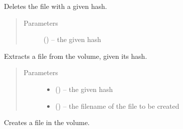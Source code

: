 \documentclass[letterpaper,10pt,english]{sphinxmanual}
\begin{document}
\begin{fulllineitems}

\begin{fulllineitems}
\label{\detokenize{index:fsbackup.hashVolume.HashVolume.remove}}
Deletes the file with a given hash.
\begin{quote}\begin{description}
\item[{Parameters}] \leavevmode
{} () -- the given hash

\end{description}\end{quote}

\end{fulllineitems}


\begin{fulllineitems}
\label{\detokenize{index:fsbackup.hashVolume.HashVolume.retrieveFilename}}
Extracts a file from the volume, given its hash.
\begin{quote}\begin{description}
\item[{Parameters}] \leavevmode\begin{itemize}
\item {} 
 () -- the given hash

\item {} 
 () -- the filename of the file to be created

\end{itemize}

\end{description}\end{quote}

\end{fulllineitems}


\begin{fulllineitems}
\label{\detokenize{index:fsbackup.hashVolume.HashVolume.storeFilename}}
Creates a file in the volume.


\end{fulllineitems}
\end{fulllineitems}
\end{document}
